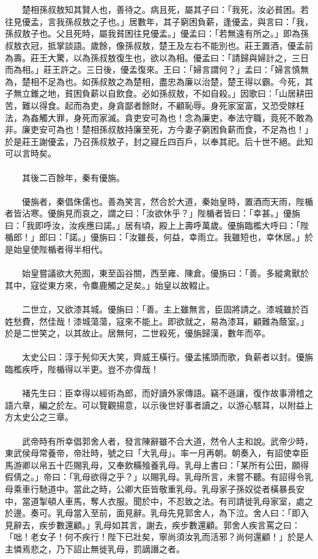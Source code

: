 \\\\
　　楚相孫叔敖知其賢人也，善待之。病且死，屬其子曰：「我死，汝必貧困。若往見優孟，言我孫叔敖之子也。」居數年，其子窮困負薪，逢優孟，與言曰：「我，孫叔敖子也。父且死時，屬我貧困往見優孟。」優孟曰：「若無遠有所之。」即為孫叔敖衣冠，抵掌談語。歲餘，像孫叔敖，楚王及左右不能別也。莊王置酒，優孟前為壽。莊王大驚，以為孫叔敖復生也，欲以為相。優孟曰：「請歸與婦計之，三日而為相。」莊王許之。三日後，優孟復來。王曰：「婦言謂何？」孟曰：「婦言慎無為，楚相不足為也。如孫叔敖之為楚相，盡忠為廉以治楚，楚王得以霸。今死，其子無立錐之地，貧困負薪以自飲食。必如孫叔敖，不如自殺。」因歌曰：「山居耕田苦，難以得食。起而為吏，身貪鄙者餘財，不顧恥辱。身死家室富，又恐受賕枉法，為姦觸大罪，身死而家滅。貪吏安可為也！念為廉吏，奉法守職，竟死不敢為非。廉吏安可為也！楚相孫叔敖持廉至死，方今妻子窮困負薪而食，不足為也！」於是莊王謝優孟，乃召孫叔敖子，封之寢丘四百戶，以奉其祀。后十世不絕。此知可以言時矣。
\\\\
　　其後二百餘年，秦有優旃。
\\\\
　　優旃者，秦倡侏儒也。善為笑言，然合於大道，秦始皇時，置酒而天雨，陛楯者皆沾寒。優旃見而哀之，謂之曰：「汝欲休乎？」陛楯者皆曰：「幸甚。」優旃曰：「我即呼汝，汝疾應曰諾。」居有頃，殿上上壽呼萬歲。優旃臨檻大呼曰：「陛楯郎！」郎曰：「諾。」優旃曰：「汝雖長，何益，幸雨立。我雖短也，幸休居。」於是始皇使陛楯者得半相代。
\\\\
　　始皇嘗議欲大苑囿，東至函谷關，西至雍、陳倉。優旃曰：「善。多縱禽獸於其中，寇從東方來，令麋鹿觸之足矣。」始皇以故輟止。
\\\\
　　二世立，又欲漆其城。優旃曰：「善。主上雖無言，臣固將請之。漆城雖於百姓愁費，然佳哉！漆城蕩蕩，寇來不能上。即欲就之，易為漆耳，顧難為蔭室。」於是二世笑之，以其故止。居無何，二世殺死，優旃歸漢，數年而卒。
\\\\
　　太史公曰：淳于髡仰天大笑，齊威王橫行。優孟搖頭而歌，負薪者以封。優旃臨檻疾呼，陛楯得以半更。豈不亦偉哉！
\\\\
　　褚先生曰：臣幸得以經術為郎，而好讀外家傳語。竊不遜讓，復作故事滑稽之語六章，編之於左。可以覽觀揚意，以示後世好事者讀之，以游心駭耳，以附益上方太史公之三章。
\\\\
　　武帝時有所幸倡郭舍人者，發言陳辭雖不合大道，然令人主和說。武帝少時，東武侯母常養帝，帝壯時，號之曰「大乳母」。率一月再朝。朝奏入，有詔使幸臣馬游卿以帛五十匹賜乳母，又奉飲糒飱養乳母。乳母上書曰：「某所有公田，願得假倩之。」帝曰：「乳母欲得之乎？」以賜乳母。乳母所言，未嘗不聽。有詔得令乳母乘車行馳道中。當此之時，公卿大臣皆敬重乳母。乳母家子孫奴從者橫暴長安中，當道掣頓人車馬，奪人衣服。聞於中，不忍致之法。有司請徙乳母家室，處之於邊。奏可。乳母當入至前，面見辭。乳母先見郭舍人，為下泣。舍人曰：「即入見辭去，疾步數還顧。」乳母如其言，謝去，疾步數還顧。郭舍人疾言罵之曰：「咄！老女子！何不疾行！陛下已壯矣，寧尚須汝乳而活邪？尚何還顧！」於是人主憐焉悲之，乃下詔止無徙乳母，罰謫譖之者。
